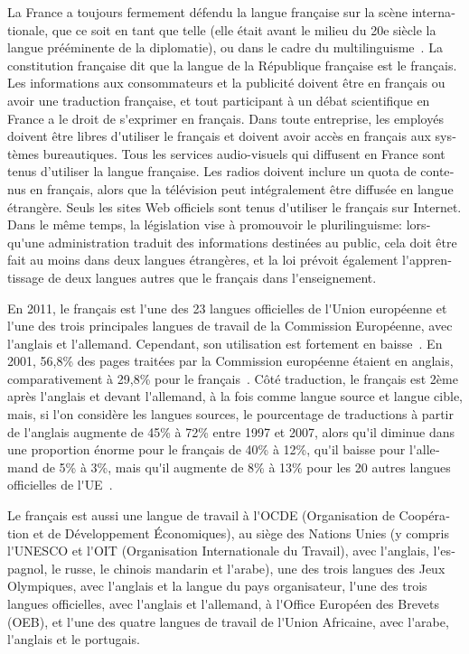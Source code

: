\begin{french}
\begin{multicols}{2}
La France a toujours fermement défendu la langue française sur la
scène internationale, que ce soit en tant que telle (elle était avant
le milieu du 20e siècle la langue prééminente de la diplomatie), ou
dans le cadre du multilinguisme~\cite{multilinguisme}. La constitution
française dit que la langue de la République française est le
français. Les informations aux consommateurs et la publicité doivent
être en français ou avoir une traduction française, et tout
participant à un débat scientifique en France a le droit de s{\mbox
 '}exprimer en français. Dans toute entreprise, les employés doivent
être libres d{\mbox '}utiliser le français et doivent avoir accès en
français aux systèmes bureautiques. Tous les services audio-visuels
qui diffusent en France sont tenus d'utiliser la langue française. Les
radios doivent inclure un quota de contenus en français, alors que la
télévision peut intégralement être diffusée en langue étrangère. Seuls
les sites Web officiels sont tenus d{\mbox '}utiliser le français sur
Internet. Dans le même temps, la législation vise à promouvoir le
plurilinguisme: lorsqu{\mbox '}une administration traduit des
informations destinées au public, cela doit être fait au moins dans
deux langues étrangères, et la loi prévoit également l{\mbox '}apprentissage 
de deux langues autres que le français dans l{\mbox '}enseignement.

En 2011, le français est l{\mbox '}une des 23 langues officielles de
l{\mbox '}Union européenne et l{\mbox '}une des trois principales
langues de travail de la Commission Européenne, avec l{\mbox '}anglais
et l{\mbox '}allemand. Cependant, son utilisation est fortement en
baisse~\cite{baisse}. En 2001, 56,8\% des pages traitées par la
Commission européenne étaient en anglais, comparativement à 29,8\%
pour le français~\cite{comparativement}. Côté traduction, le français
est 2ème après l{\mbox '}anglais et devant l{\mbox '}allemand, à la
fois comme langue source et langue cible, mais, si l{\mbox '}on
considère les langues sources, le pourcentage de traductions à partir
de l{\mbox '}anglais augmente de 45\% à 72\% entre 1997 et 2007, alors
qu{\mbox '}il diminue dans une proportion énorme pour le français de
40\% à 12\%, qu{\mbox '}il baisse pour l{\mbox '}allemand de 5\% à
3\%, mais qu{\mbox '}il augmente de 8\% à 13\% pour les 20 autres
langues officielles de l{\mbox '}UE~\cite{dgt08}.

Le français est aussi une langue de travail à l{\mbox '}OCDE
(Organisation de Coopération et de Développement Économiques), au
siège des Nations Unies (y compris l{\mbox '}UNESCO et l{\mbox '}OIT
(Organisation Internationale du Travail), avec l{\mbox '}anglais,
l{\mbox '}espagnol, le russe, le chinois mandarin et l{\mbox '}arabe),
une des trois langues des Jeux Olympiques, avec l{\mbox '}anglais et
la langue du pays organisateur, l{\mbox '}une des trois langues
officielles, avec l{\mbox '}anglais et l{\mbox '}allemand, à l{\mbox
 '}Office Européen des Brevets (OEB), et l{\mbox '}une des quatre
langues de travail de l{\mbox '}Union Africaine, avec l{\mbox '}arabe,
l{\mbox '}anglais et le portugais.


\end{multicols}
\end{french}
